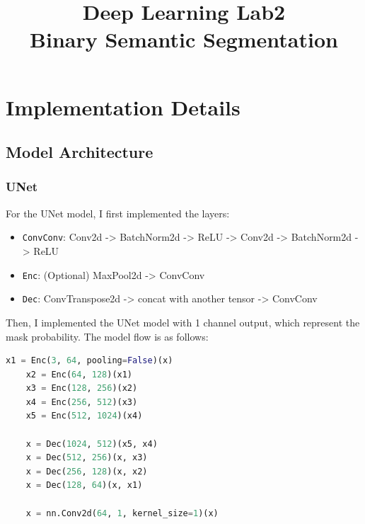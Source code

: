 \documentclass{homework}
\begin{document}
\title{Deep Learning Lab2 \\ Binary Semantic Segmentation}
\author{\chineseName \masterStudentID}
\date{}
\maketitle

\section{Implementation Details}


\subsection{Model Architecture}

\subsubsection{UNet}

For the UNet model, I first implemented the layers:

\begin{itemize}
    \item \lstinline{ConvConv}: Conv2d -> BatchNorm2d -> ReLU -> Conv2d -> BatchNorm2d -> ReLU
    \item \lstinline{Enc}: (Optional) MaxPool2d -> ConvConv
    \item \lstinline{Dec}: ConvTranspose2d -> concat with another tensor -> ConvConv
\end{itemize}

Then, I implemented the UNet model with 1 channel output, which represent the mask probability. The model flow is as follows:

\begin{lstlisting}[language=Python]
    x1 = Enc(3, 64, pooling=False)(x)
    x2 = Enc(64, 128)(x1)
    x3 = Enc(128, 256)(x2)
    x4 = Enc(256, 512)(x3)
    x5 = Enc(512, 1024)(x4)

    x = Dec(1024, 512)(x5, x4)
    x = Dec(512, 256)(x, x3)
    x = Dec(256, 128)(x, x2)
    x = Dec(128, 64)(x, x1)

    x = nn.Conv2d(64, 1, kernel_size=1)(x)
\end{lstlisting}
\end{document}
